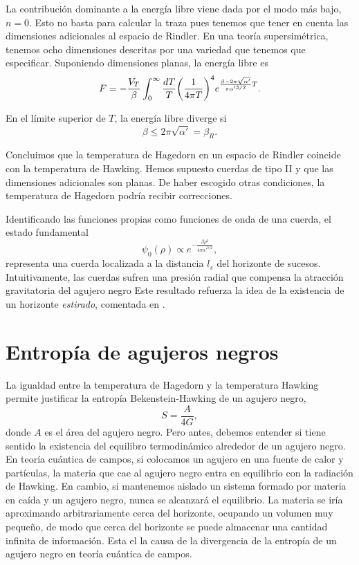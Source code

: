 La contribución dominante a la energía libre viene dada por el modo más bajo, $n=0$.
Esto no basta para calcular la traza pues tenemos que tener en cuenta las dimensiones adicionales al espacio de Rindler. 
En una teoría supersimétrica, tenemos ocho dimensiones descritas por una variedad que tenemos que especificar.
Suponiendo dimensiones planas, la energía libre es
\begin{equation}
  F= -\frac{V_T}{\beta}\int_0^\infty \frac{dT}{T}\qty(\frac{1}{4\pi T})^4 e^{\frac{\beta-2\pi\sqrt{\alpha'}}{\pi\alpha'^{3/2}}T}.
\end{equation}

En el límite superior de $T$, la energía libre diverge si
\begin{equation}
  \beta \leq 2\pi\sqrt{\alpha'}=\beta_R.
\end{equation}

Concluimos que la temperatura de Hagedorn en un espacio de Rindler coincide con la temperatura
de Hawking.
Hemos supuesto cuerdas de tipo II y que las dimensiones adicionales son planas.
De haber escogido otras condiciones, la temperatura de Hagedorn podría recibir correcciones.

Identificando las funciones propias como funciones de onda de una cuerda, el estado fundamental
\begin{equation}
  \psi_0(\rho)\propto e^{-\frac{\beta \rho^2}{4\pi\alpha'^{3/2}} },
  \label{eq:func}
\end{equation}
representa una cuerda localizada a la distancia $l_s$ del horizonte de sucesos.
Intuitivamente, las cuerdas sufren una presión radial que compensa la atracción gravitatoria del agujero negro
Este resultado refuerza la idea de la existencia de un horizonte \emph{estirado}, comentada en 
\cite{Susskind1993}.

\section{Entropía de agujeros negros}

La igualdad entre la temperatura de Hagedorn y la temperatura Hawking permite justificar
la entropía Bekenstein-Hawking de un agujero negro,
\begin{equation}
  S = \frac{A}{4G},
\end{equation}
donde $A$ es el área del agujero negro.
Pero antes, debemos entender si tiene sentido la existencia del equilibro termodinámico alrededor
de un agujero negro. 
En teoría cuántica de campos, si colocamos un agujero en una fuente de calor y partículas, 
la materia que cae al agujero negro entra en equilibrio con la radiación de Hawking.
En cambio, si mantenemos aislado un sistema formado por materia en caída y un agujero
negro, nunca se alcanzará el equilibrio.
La materia se iría aproximando arbitrariamente cerca del horizonte, ocupando un volumen muy
pequeño, de modo que cerca del horizonte se puede almacenar una cantidad infinita de información.
Esta el la causa de la divergencia de la entropía de un agujero negro en teoría cuántica de campos.

